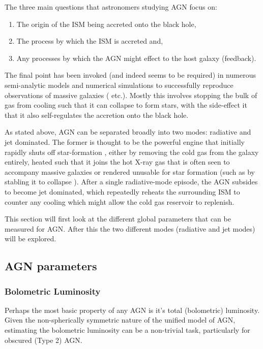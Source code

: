 	The three main questions that astronomers studying AGN focus on:
	\begin{enumerate}
		\item The origin of the ISM being accreted onto the black hole,
		\item The process by which the ISM is accreted and,
		\item Any processes by which the AGN might effect to the host galaxy (feedback).
	\end{enumerate}
	The final point has been invoked (and indeed seems to be required) in numerous semi-analytic models and numerical simulations to successfully reproduce observations of massive galaxies (\citet{DiMatteo2005, Bower2006, Springel2005} etc.). Mostly this involves stopping the bulk of gas from cooling such that it can collapse to form stars, with the side-effect it that it also self-regulates the accretion onto the black hole.

	As stated above, AGN can be separated broadly into two modes: radiative and jet dominated. The former is thought to be the powerful engine that initially rapidly shuts off star-formation \citep{Thomas2005, Thomas2010}, either by removing the cold gas from the galaxy entirely, heated such that it joins the hot X-ray gas that is often seen to accompany massive galaxies \citep{OSullivan2001} or rendered unusable for star formation (such as by stabling it to collapse \citep{Martig2009}). After a single radiative-mode episode, the AGN subsides to become jet dominated, which repeatedly reheats the surrounding ISM to counter any cooling which might allow the cold gas reservoir to replenish. 

	This section will first look at the different global parameters that can be measured for AGN. After this the two different modes (radiative and jet modes) will be explored.

	\subsection{AGN parameters}
		\label{subsec:AGNparams}

		\subsubsection{Bolometric Luminosity}
			Perhaps the most basic property of any AGN is it's total (bolometric) luminosity. Given the non-spherically symmetric nature of the unified model of AGN, estimating the bolometric luminosity can be a non-trivial task, particularly for obscured (Type 2) AGN. 

